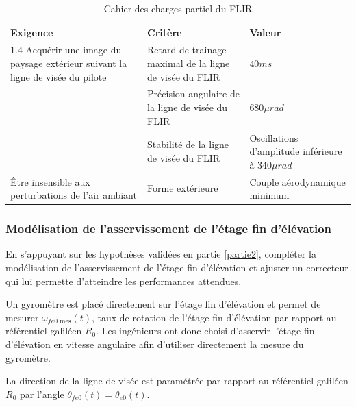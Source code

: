 \begin{table}[!htb]
\begin{center}
\begin{tabular}{|p{}|p{}|p{}|}
\hline 
\textbf{Exigence} & \textbf{Critère} & \textbf{Valeur} \\ 
\hline 
1.4 Acquérir une image du paysage
extérieur suivant la ligne de visée
du pilote & Retard de trainage maximal de la
ligne de visée du FLIR & $40ms$ \\ 
\cline{2-3} 
& Précision angulaire de la ligne de
visée du FLIR & $680\mu rad$\\ 
\cline{2-3}  
 & Stabilité de la ligne de visée du
FLIR & Oscillations d'amplitude inférieure
à $340 \mu rad$ \\ 
\hline  
Être insensible aux perturbations
de l'air ambiant & Forme extérieure & Couple aérodynamique minimum\\ 
\hline
\end{tabular} 
\caption{Cahier des charges partiel du FLIR \label{tab2}}
\end{center}
\end{table}

\FloatBarrier
\subsubsection{Modélisation de l'asservissement de l'étage fin d'élévation}

\begin{objectif}
En s'appuyant sur les hypothèses validées en partie \ref{partie2}, compléter la modélisation de l'asservissement de
l'étage fin d'élévation et ajuster un correcteur qui lui permette d'atteindre les performances attendues.
\end{objectif}

Un gyromètre est placé directement sur l'étage fin d'élévation et permet de mesurer $\omega_{fe0\text{ mes}}(t)$, taux de rotation de l'étage fin d'élévation par rapport au référentiel galiléen $R_0$. Les ingénieurs ont donc choisi d'asservir l'étage
fin d'élévation en vitesse angulaire afin d'utiliser directement la mesure du gyromètre.

La direction de la ligne de visée est paramétrée par rapport au référentiel galiléen $R_0$ par l'angle $\theta_{fe0}(t)=\theta_{e0}(t)$.

